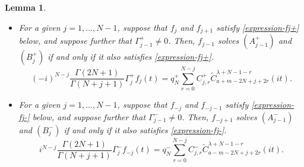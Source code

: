 \documentclass[12pt, pdflatex, a4paper]{article}
\theoremstyle{plain}
\newtheorem{lemma}[thm]{Lemma}
\theoremstyle{definition}
\def\Geg{\widetilde{C}}
\begin{document}
\begin{lemma} \label{lemma-recurrence-fj}
\begin{itemize}
\item[\normalfont{(1)}] For a given $j=1, \ldots, N-1$, suppose that $f_j$ and $f_{j+1}$ satisfy \eqref{expression-fj+} below, and suppose further that $\Gamma_{j-1}^+ \neq 0$. Then, $f_{j-1}$ solves $(A_{j-1}^+)$ and $(B_j^+)$ if and only if it also satisfies \eqref{expression-fj+}.
\begin{equation}\label{expression-fj+}
(-i)^{N-j} \frac{\Gamma(2N+1)}{\Gamma(N+j+1)}\Gamma_j^+
 f_j(t) = q_N^+ \sum_{r=0}^{N-j} C_{j,r}^+\Geg_{a+m-2N+j+2r}^{\lambda +N-1-r}(it).
\end{equation}
\item[\normalfont{(2)}] For a given $j=1, \ldots, N-1$, suppose that $f_{-j}$ and $f_{-j-1}$ satisfy \eqref{expression-fj-} below, and suppose further that $\Gamma_{j-1}^- \neq 0$. Then, $f_{-j+1}$ solves $(A_{j-1}^-)$ and $(B_j^-)$ if and only if it also satisfies \eqref{expression-fj-}.
\begin{equation}\label{expression-fj-}
i^{N-j} \frac{\Gamma(2N+1)}{\Gamma(N+j+1)}\Gamma_j^-
 f_{-j}(t) = q_N^- \sum_{r=0}^{N-j} C_{j,r}^-\Geg_{a-m-2N+j+2r}^{\lambda +N-1-r}(it).
\end{equation}
\end{itemize}
\end{lemma}
\end{document}
